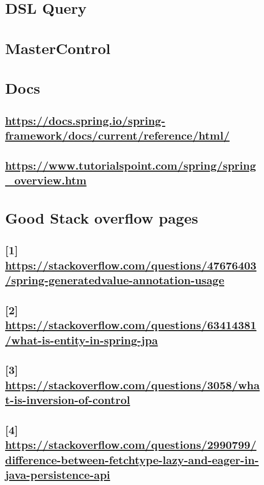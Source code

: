 \documentclass[11pt]{article}
\begin{document}
\section{DSL Query}
\label{sec:org2a18ecb}

\section{MasterControl}
\label{sec:org0a65320}

\section{Docs}
\label{sec:org637f899}
\subsection{\url{https://docs.spring.io/spring-framework/docs/current/reference/html/}}
\label{sec:org5052161}
\subsection{\url{https://www.tutorialspoint.com/spring/spring\_overview.htm}}
\label{sec:org2d9ff77}
\section{Good Stack overflow pages}
\label{sec:orgf675903}
\subsection{[1] \url{https://stackoverflow.com/questions/47676403/spring-generatedvalue-annotation-usage}}
\label{sec:org7ee3707}
\subsection{[2] \url{https://stackoverflow.com/questions/63414381/what-is-entity-in-spring-jpa}}
\label{sec:org0c6e763}
\subsection{[3] \url{https://stackoverflow.com/questions/3058/what-is-inversion-of-control}}
\label{sec:org4b89602}
\subsection{[4] \url{https://stackoverflow.com/questions/2990799/difference-between-fetchtype-lazy-and-eager-in-java-persistence-api}}
\label{sec:org86e245e}
\end{document}
